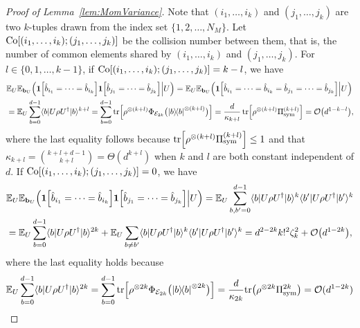 \documentclass[aps,prl,twocolumn,nofootinbib,superscriptaddress,10pt]{revtex4-2}
\let\originalleft\left
\let\originalright\right
\renewcommand{\left}{\mathopen{}\mathclose\bgroup\originalleft}
\renewcommand{\right}{\aftergroup\egroup\originalright}
\def\E{ {\mathbb E} } %
\def\>{\rangle}
\def\<{\langle}
\newcommand{\ketbra}[2]{\ensuremath{\left|#1\right\rangle\!\left\langle#2\right|}}
\newcommand{\tr}[1]{\mathrm{tr}\left( #1 \right)}
\DeclareMathOperator{\Tr}{tr}
\newcommand{\bigo}[1]{\mathcal{O}\left(#1\right)}
\theoremstyle{plain}
\theoremstyle{definition}
\newcommand{\lref}[1]{Lemma~\ref{#1}}
\begin{document}
\begin{proof}[Proof of \lref{lem:MomVariance}]
Note that $(i_1,\dots,i_k)$ and $(j_1,\dots,j_k)$ are two $k$-tuples drawn from the index set $\{1,2,\dots,N_M\}$. Let ${\rm Co}[(i_1,\dots,i_k);(j_1,\dots,j_k)]$ be the collision number between them, that is, the number of common elements shared by $(i_1,\dots,i_k)$ and $(j_1,\dots,j_k)$. %
For $l\in\{0,1,\dots,k-1\}$, if 
${\rm Co}[(i_1,\dots,i_k);(j_1,\dots,j_k)]=k-l$, we have 
\begin{align}\label{eq:EE1casea}
&\E_{U} \E_{\mathbf{b}_{U}} \Big(
\textbf{1}\left[\hat{b}_{i_1}=\dots=\hat{b}_{i_k}\right]  
\textbf{1}\left[\hat{b}_{j_1}=\dots=\hat{b}_{j_k}\right]  \Big| U \Big)
= \E_{U} \E_{\mathbf{b}_{U}} \Big(
\textbf{1}\left[\hat{b}_{i_1}=\dots=\hat{b}_{i_k}=\hat{b}_{j_1}=\dots=\hat{b}_{j_k}\right] \Big| U \Big) \nonumber\\
&=
\E_{U} \sum_{b=0}^{d-1} \<b|U\rho U^{\dag}|b\>^{k+l}=\sum_{b=0}^{d-1} \Tr \left[ \rho^{\otimes (k+l)}  \Phi_{\mathcal E_{2k}} \big( \ketbra{b}{b}^{\otimes (k+l)} \big) \right] 
=\frac{d}{\kappa_{k+l}} \Tr \left[ \rho^{\otimes {(k+l)}} \Pi_{\mathrm{sym}}^{(k+l)} \right] 
= \bigo{d^{1-k-l}}, 
\end{align}
where the last equality follows because $\Tr \left[ \rho^{\otimes {(k+l)}} \Pi_{\mathrm{sym}}^{(k+l)} \right] \leq 1$ and that 
$\kappa_{k+l}=\binom{k+l+d-1}{k+l}=\Theta(d^{k+l})$ when $k$ and $l$ are both constant independent of $d$. 
If ${\rm Co}[(i_1,\dots,i_k);(j_1,\dots,j_k)]=0$, we have 
\begin{align}\label{eq:EE1caseb}
&\E_{U} \E_{\mathbf{b}_{U}} \Big(
\textbf{1}\left[\hat{b}_{i_1}=\dots=\hat{b}_{i_k}\right]  
\textbf{1}\left[\hat{b}_{j_1}=\dots=\hat{b}_{j_k}\right]  \Big| U \Big)
= 
\E_{U} \sum_{b,b'=0}^{d-1} \<b|U\rho U^{\dag}|b\>^{k} \<b'|U\rho U^{\dag}|b'\>^{k}
\nonumber\\
&=
\E_{U} \sum_{b=0}^{d-1} \<b|U\rho U^{\dag}|b\>^{2k}
+\E_{U} \sum_{b\ne b'} \<b|U\rho U^{\dag}|b\>^{k} \<b'|U\rho U^{\dag}|b'\>^{k}
=d^{2-2k} k!^2\zeta_k^2  +\bigo{d^{1-2k}},
\end{align}
where the last equality holds because 
\begin{align}
	\E_{U} \sum_{b=0}^{d-1} \<b|U\rho U^{\dag}|b\>^{2k}
	=\sum_{b=0}^{d-1} \Tr \left[ \rho^{\otimes 2k}  \Phi_{\mathcal E_{2k}} \big( \ketbra{b}{b}^{\otimes 2k} \big) \right]
	= \frac{d}{\kappa_{2k}} \tr{\rho^{\otimes 2k} \Pi_{\mathrm{sym}}^{2k} }
	= \mathcal{O}(d^{1-2k})  
\end{align}

\end{proof}
\end{document}
